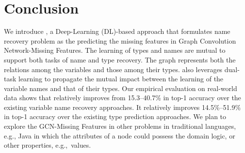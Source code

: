 \section{Conclusion}
\label{sec:conclusion}

We introduce {\tool}, a Deep-Learning (DL)-based approach that
formulates name recovery problem as the predicting the missing
features in Graph Convolution Network-Missing Features.  The learning
of types and names are mutual to support both tasks of name and type
recovery.  The graph represents both the relations among the variables
and those among their types. {\tool} also leverages dual-task learning
to propagate the mutual impact between the learning of the variable
names and that of their types. Our empirical evaluation on real-world data
shows that
{\tool} relatively improves from 15.3--40.7\% in top-1
accuracy over the existing variable name recovery approaches.
It relatively improves 14.5\%--51.9\% in top-1 accuracy over the
existing type prediction approaches.
We plan to explore the
GCN-Missing Features in other problems in traditional languages, e.g.,
Java in which the attributes of a node could possess the domain logic,
or other properties, e.g.,~values.
